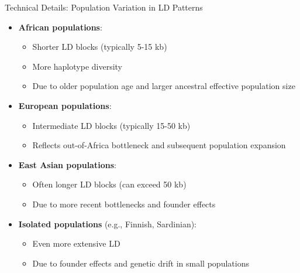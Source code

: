\begin{frame}{Technical Details: Population Variation in LD Patterns}

\begin{itemize}
\item \textbf{African populations}:
\begin{itemize}
\item Shorter LD blocks (typically 5-15 kb)
\item More haplotype diversity
\item Due to older population age and larger ancestral effective population size
\end{itemize}
\end{itemize}

\begin{itemize}
\item \textbf{European populations}:
\begin{itemize}
\item Intermediate LD blocks (typically 15-50 kb)
\item Reflects out-of-Africa bottleneck and subsequent population expansion
\end{itemize}
\end{itemize}

\begin{itemize}
\item \textbf{East Asian populations}:
\begin{itemize}
\item Often longer LD blocks (can exceed 50 kb)
\item Due to more recent bottlenecks and founder effects
\end{itemize}
\end{itemize}

\begin{itemize}
\item \textbf{Isolated populations} (e.g., Finnish, Sardinian):
\begin{itemize}
\item Even more extensive LD
\item Due to founder effects and genetic drift in small populations
\end{itemize}
\end{itemize}
\end{frame}

